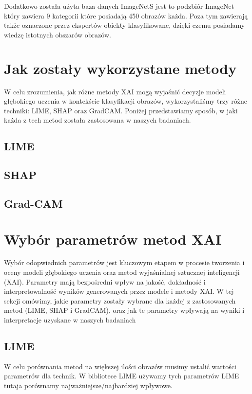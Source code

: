 Dodatkowo została użyta baza danych ImageNetS jest to podzbiór ImageNet który zawiera 9 kategorii które posiadają 450 obrazów każda.
Poza tym zawierają także oznaczone przez ekspertów obiekty klasyfikowane, dzięki czemu posiadamy wiedzę istotnych obszarów obrazów.

\section*{Jak zostały wykorzystane metody}
W celu zrozumienia, jak różne metody XAI mogą wyjaśnić decyzje modeli głębokiego uczenia w kontekście klasyfikacji obrazów, wykorzystaliśmy trzy różne techniki: LIME, SHAP oraz GradCAM.
Poniżej przedstawiamy sposób, w jaki każda z tech metod została zastosowana w naszych badaniach.

\subsection*{LIME}

\subsection*{SHAP}

\subsection*{Grad-CAM}

\section*{Wybór parametrów metod XAI}
Wybór odopwiednich parametrów jest kluczowym etapem w procesie tworzenia i oceny modeli głębokiego uczenia oraz metod wyjaśnialnej sztucznej inteligencji (XAI).
Parametry mają bezpośredni wpływ na jakość, dokładność i interpretowalność wyników generowanych przez modele i metody XAI.
W tej sekcji omówimy, jakie parametry zostały wybrane dla każdej z zastosowanych metod (LIME, SHAP i GradCAM), oraz jak te parametry wpływają na wyniki i interpretacje uzyskane w naszych badaniach

\subsection*{LIME}
W celu porównania metod na większej ilości obrazów musimy ustalić wartości parametrów dla technik.
W bibliotece LIME używamy tych parametrów LIME tutaja porównamy najważniejsze/najbardziej wpływowe.

